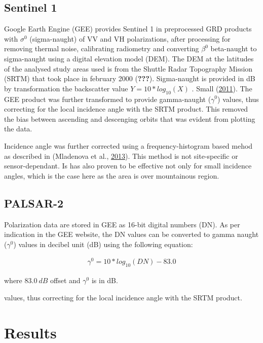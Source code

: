 \documentclass[smallextended]{svjour3}       %
\begin{document}
\hypertarget{sentinel-1}{%
\subsection{Sentinel 1}\label{sentinel-1}}

Google Earth Engine (GEE) provides Sentinel 1 in preprocessed GRD
products with \(\sigma^0\) (sigma-naught) of VV and VH polarizations,
after processing for removing thermal noise, calibrating radiometry and
converting \(\beta^0\) beta-naught to sigma-naught using a digital
elevation model (DEM). The DEM at the latitudes of the analysed study
areas used is from the Shuttle Radar Topography Mission (SRTM) that took
place in february 2000 ({\textbf{???}}). Sigma-naught is provided in dB
by transformation the backscatter value \(Y=10*log_{10}(X)\) . Small
(\protect\hyperlink{ref-Small2011}{2011}). The GEE product was further
transformed to provide gamma-naught (\(\gamma^0\)) values, thus
correcting for the local incidence angle with the SRTM product. This
removed the bias between ascending and descenging orbits that was
evident from plotting the data.

Incidence angle was further corrected using a frequency-histogram based
mehod as described in (Mladenova et al.,
\protect\hyperlink{ref-Mladenova2013}{2013}). This method is not
site-specific or sensor-dependant. Is has also proven to be effective
not only for small incidence angles, which is the case here as the area
is over mountainous region.

\hypertarget{palsar-2}{%
\subsection{PALSAR-2}\label{palsar-2}}

Polarization data are stored in GEE as 16-bit digital numbers (DN). As
per indication in the GEE website, the DN values can be converted to
gamma naught (\(\gamma^0\)) values in decibel unit (dB) using the
following equation:

\[
\begin{aligned}
 \gamma^0 = 10*log_{10}(DN) - 83.0  
\end{aligned}
\]

where \(83.0 \  dB\) offset and \(\gamma^0\) is in dB.

values, thus correcting for the local incidence angle with the SRTM
product.

\hypertarget{results}{%
\section{Results}\label{results}}
\end{document}
